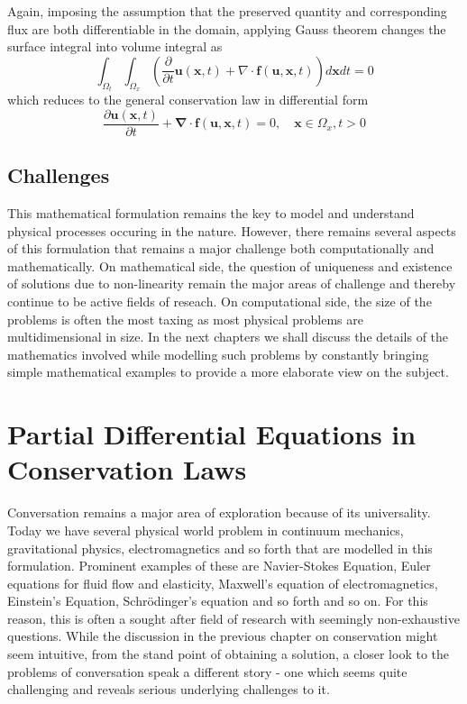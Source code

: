 \documentclass[11pt, a4paper]{report}
\begin{document}
Again, imposing the assumption that the preserved quantity and corresponding 
flux are both differentiable in the domain, applying Gauss theorem changes the surface integral into volume integral as
\begin{equation*}
    \int_{\Omega_{t}}\int_{\Omega_{x}}\left(\frac{\partial}{\partial t}{\bm u}({\bm x}, t) + \nabla\cdot {\bm f}({\bm u}, {\bm x}, t)\right)d{\bm x}dt = 0
\end{equation*}
which reduces to the general conservation law in differential form 
\begin{equation*}
    \frac {\partial {\bm u}({\bm x}, t)}{\partial t} + {\bm \nabla}\cdot {\bm f}({\bm u}, {\bm x}, t) = 0, \quad {\bm x}\in\Omega_{x}, t>0
\end{equation*}



\section{Challenges}
This mathematical formulation remains the key to model and understand physical processes occuring in the nature. 
However, there remains several aspects of this formulation that remains a major challenge both computationally and
mathematically. On mathematical side, the question of uniqueness and existence of solutions due to non-linearity
remain the major areas of challenge and thereby continue to be active fields of reseach. On computational side, the
size of the problems is often the most taxing as most physical problems are multidimensional in size. In the next 
chapters we shall discuss the details of the mathematics involved while modelling such problems by constantly bringing
simple mathematical examples to provide a more elaborate view on the subject.






\chapter{Partial Differential Equations in Conservation Laws}
Conversation remains a major area of exploration because of its universality. Today we have several physical world
problem in continuum mechanics, gravitational physics, electromagnetics and so forth that are modelled in this 
formulation. Prominent examples of these are Navier-Stokes Equation, Euler equations for fluid flow and elasticity,
Maxwell's equation of electromagnetics, Einstein's Equation, Schr{\"o}dinger's equation and so forth and so on. For
this reason, this is often a sought after field of research with seemingly non-exhaustive questions. While the 
discussion in the previous chapter on conservation might seem intuitive, from the stand point of obtaining a 
solution, a closer look to the problems of conversation speak a different story - one which seems quite challenging 
and reveals serious underlying challenges to it. 
\end{document}
